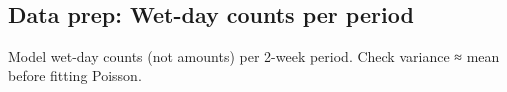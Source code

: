 \documentclass[11pt]{article}
\begin{document}
    \begin{center}
    \end{center}
    { \hspace*{\fill} \\}
    
    \hypertarget{data-prep-wet-day-counts-per-period}{%
\subsection{Data prep: Wet-day counts per
period}\label{data-prep-wet-day-counts-per-period}}

Model wet-day counts (not amounts) per 2-week period. Check variance ≈
mean before fitting Poisson.
\end{document}
